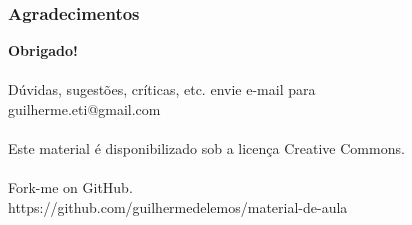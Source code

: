 \begin{frame}
\frametitle{Agradecimentos}
\begin{center}
{\huge \textbf{Obrigado!}}\\~\\

Dúvidas, sugestões, críticas, etc. envie e-mail para\\
guilherme.eti@gmail.com\\~\\

Este material é disponibilizado sob a licença Creative Commons.\\~\\

Fork-me on GitHub.\\
https://github.com/guilhermedelemos/material-de-aula\\~\\
\end{center}

\end{frame}
